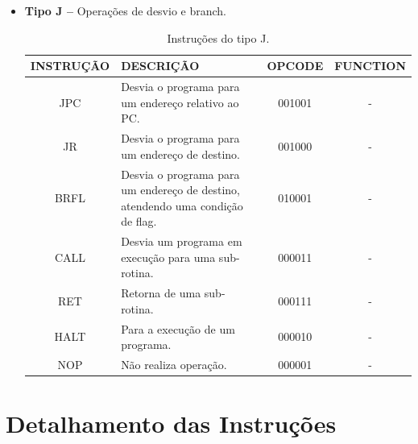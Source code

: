 \documentclass{report}
\begin{document}
\begin{itemize}
    \item \textbf{Tipo J --} Operações de desvio e branch.
    
	\begin{table}[H]
	\centering
	\begin{tabular}{|c|m{6cm}|c|c|}
  	\hline 
  	\textbf{INSTRUÇÃO} & \textbf{DESCRIÇÃO} & \textbf{OPCODE} & \textbf{FUNCTION} \\ 
  	\hline 
  	JPC & Desvia o programa para um endereço relativo ao PC. & 001001 & - \\ \hline
    JR & Desvia o programa para um endereço de destino. & 001000 & - \\ \hline
  	BRFL & Desvia o programa para um endereço de destino, atendendo uma condição de flag. & 010001 & - \\ \hline
  	CALL & Desvia um programa em execução para uma sub-rotina. & 000011 & - \\ \hline
  	RET & Retorna de uma sub-rotina. & 000111 & - \\ \hline
  	HALT & Para a execução de um programa. & 000010 & - \\ \hline
  	NOP & Não realiza operação. & 000001 & - \\ \hline
  	\end{tabular} 
  	\caption{Instruções do tipo J.}
  \end{table}
    
    \end{itemize}

  \section{Detalhamento das Instruções}
  
\end{document}
